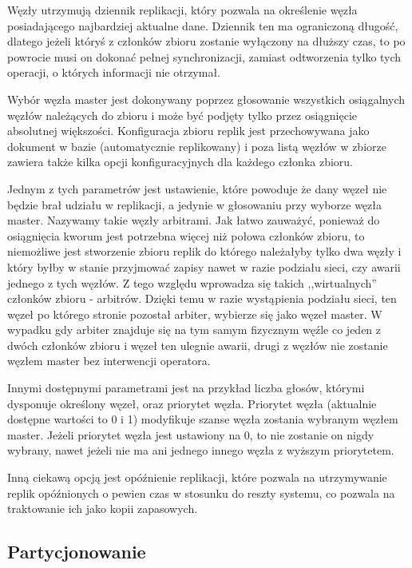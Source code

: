 Węzły utrzymują dziennik replikacji, który pozwala na określenie węzła posiadającego najbardziej aktualne dane.
Dziennik ten ma ograniczoną długość, dlatego jeżeli któryś z członków zbioru zostanie wyłączony na dłuższy czas, to po powrocie musi on dokonać pełnej synchronizacji, zamiast odtworzenia tylko tych operacji, o których informacji nie otrzymał.

Wybór węzła master jest dokonywany poprzez głosowanie wszystkich osiągalnych węzłów należących do zbioru i może być podjęty tylko przez osiągnięcie absolutnej większości.
Konfiguracja zbioru replik jest przechowywana jako dokument w bazie (automatycznie replikowany) i poza listą węzłów w zbiorze zawiera także kilka opcji konfiguracyjnych dla każdego członka zbioru.

Jednym z tych parametrów jest ustawienie, które powoduje że dany węzeł nie będzie brał udziału w replikacji, a jedynie w głosowaniu przy wyborze węzła master.
Nazywamy takie węzły arbitrami.
Jak łatwo zauważyć, ponieważ do osiągnięcia kworum jest potrzebna więcej niż połowa członków zbioru, to niemożliwe jest stworzenie zbioru replik do którego należałyby tylko dwa węzły i który byłby w stanie przyjmować zapisy nawet w razie podziału sieci, czy awarii jednego z tych węzłów.
Z tego względu wprowadza się takich ,,wirtualnych'' członków zbioru - arbitrów.
Dzięki temu w razie wystąpienia podziału sieci, ten węzeł po którego stronie pozostał arbiter, wybierze się jako węzeł master.
W wypadku gdy arbiter znajduje się na tym samym fizycznym węźle co jeden z dwóch członków zbioru i węzeł ten ulegnie awarii, drugi z węzłów nie zostanie węzłem master bez interwencji operatora.

Innymi dostępnymi parametrami jest na przykład liczba głosów, którymi dysponuje określony węzeł, oraz priorytet węzła.
Priorytet węzła (aktualnie dostępne wartości to 0 i 1) modyfikuje szanse węzła zostania wybranym węzłem master.
Jeżeli priorytet węzła jest ustawiony na 0, to nie zostanie on nigdy wybrany, nawet jeżeli nie ma ani jednego innego węzła z wyższym priorytetem.

Inną ciekawą opcją jest opóźnienie replikacji, które pozwala na utrzymywanie replik opóźnionych o pewien czas w stosunku do reszty systemu, co pozwala na traktowanie ich jako kopii zapasowych.

\subsection*{Partycjonowanie}

